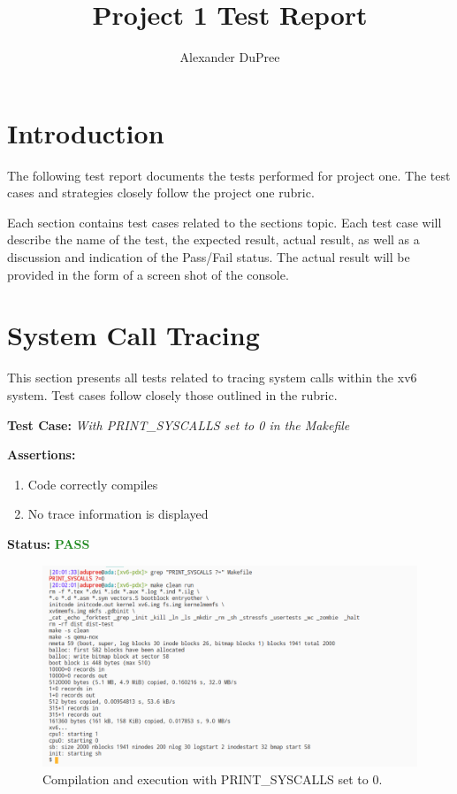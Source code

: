 \documentclass[11pt,letterpaper]{report}
\begin{document}
\title{Project 1 Test Report}
\author{Alexander DuPree}

\ifdefined \LF
{\Large     %
\fi

  \maketitle
  \section*{Introduction}
  \noindent
  The following test report documents the tests performed for project one. The test cases and strategies closely follow the project one rubric. 

  Each section contains test cases related to the sections topic. Each test case will describe the name of the test, 
  the expected result, actual result, as well as a discussion and indication of the Pass/Fail status. 
  The actual result will be provided in the form of a screen shot of the console. 

  \section*{System Call Tracing}
  This section presents all tests related to tracing system calls within the xv6 system. 
  Test cases follow closely those outlined in the rubric. \hfill \break
  
  \noindent\textbf{Test Case:} \emph{With PRINT\_SYSCALLS set to 0 in the Makefile}
  
  \noindent\textbf{Assertions:}
  \begin{enumerate}[]
  \item Code correctly compiles
  \item No trace information is displayed
  \end{enumerate}  
  
  \noindent\textbf{Status:} \textcolor{ForestGreen}{\textbf{PASS}}
  
  \begin{figure}[h!]
	\centering
	\includegraphics[width=1\linewidth]{test1.png}
	\caption[PRINT\_SYSCALLS=0]{Compilation and execution with PRINT\_SYSCALLS set to 0.}
	\label{fig:P1compileP0-1}
  \end{figure}

}
\end{document}
